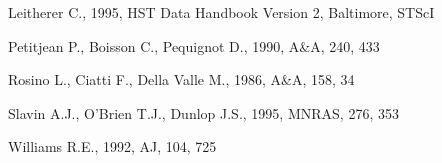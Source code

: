 \begin{thebibliography}{}
 Leitherer C., 1995, HST Data Handbook Version 2, Baltimore, STScI

 Petitjean P., Boisson C., Pequignot D., 1990, A\&A, 240, 433

Rosino L., Ciatti F., Della Valle M., 1986, A\&A, 158, 34

 Slavin A.J., O'Brien T.J., Dunlop J.S., 1995, MNRAS, 276, 353

Williams R.E., 1992, AJ, 104, 725

\end{thebibliography}

\newpage

